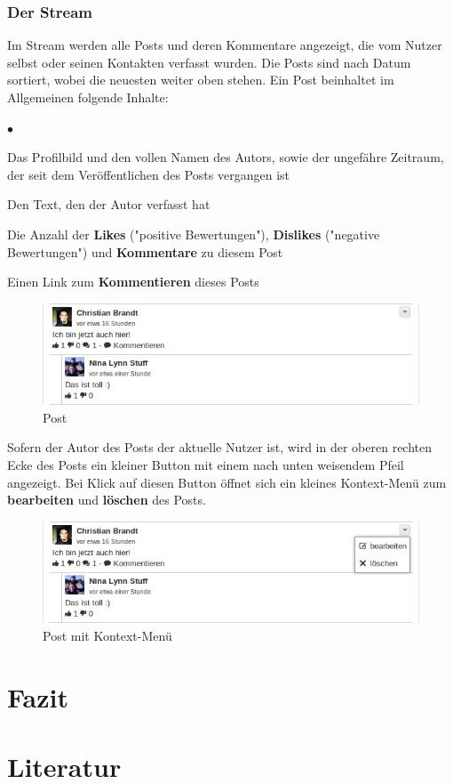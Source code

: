 \documentclass[10pt,a4paper]{book}
\makeatletter
\def\ScaleIfNeeded{%
\ifdim\Gin@nat@width>\linewidth
\linewidth
\else
\Gin@nat@width
\fi
}
\makeatother
\begin{document}
\subsection{Der Stream}
Im Stream werden alle Posts und deren Kommentare angezeigt, die vom Nutzer selbst oder seinen Kontakten verfasst wurden. Die Posts sind nach Datum sortiert, wobei die neuesten weiter oben stehen.
Ein Post beinhaltet im Allgemeinen folgende Inhalte:
\begin{list}{$\bullet$}{}
\item Das Profilbild und den vollen Namen des Autors, sowie der ungefähre Zeitraum, der seit dem Veröffentlichen des Posts vergangen ist
\item Den Text, den der Autor verfasst hat
\item Die Anzahl der \textbf{Likes} ("positive Bewertungen"), \textbf{Dislikes} ("negative Bewertungen") und \textbf{Kommentare} zu diesem Post
\item Einen Link zum \textbf{Kommentieren} dieses Posts
\end{list}
\begin{figure}[htbp]
\centering
\includegraphics[width=\ScaleIfNeeded]{Pictures/screen_post.png}%
\caption{Post}%
\end{figure}
Sofern der Autor des Posts der aktuelle Nutzer ist, wird in der oberen rechten Ecke des Posts ein kleiner Button mit einem nach unten weisendem Pfeil angezeigt. Bei Klick auf diesen Button öffnet sich ein kleines Kontext-Menü zum \textbf{bearbeiten} und \textbf{löschen} des Posts.
\begin{figure}[htbp]
\centering
\includegraphics[width=\ScaleIfNeeded]{Pictures/screen_post_menu.png}%
\caption{Post mit Kontext-Menü}%
\end{figure}
\chapter{Fazit}

\chapter{Literatur}
\end{document}
